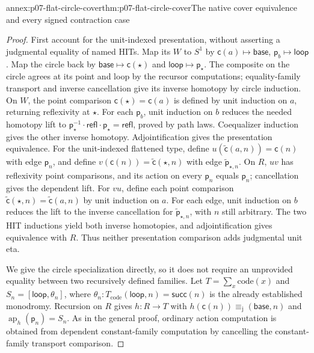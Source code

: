 \begin{annexitem}{annex:p07-flat-circle-cover}{thm:p07-flat-circle-cover}{The native cover equivalence and every signed contraction case}
\begin{proof}
First account for the unit-indexed presentation, without asserting a
judgmental equality of named HITs. Map its \(W\) to \(S^1\) by
\(\mathsf c(a)\mapsto\mathsf{base}\),
\(\mathsf p_b\mapsto\mathsf{loop}\).
Map the circle back by \(\mathsf{base}\mapsto\mathsf c(\star)\)
and \(\mathsf{loop}\mapsto\mathsf p_\star\).
The composite on the circle agrees at its point and loop by the
recursor computations; equality-family transport and inverse
cancellation give its inverse homotopy by circle induction.
On \(W\), the point comparison
\(\mathsf c(\star)=\mathsf c(a)\) is defined by unit induction on
\(a\), returning reflexivity at \(\star\).
For each \(\mathsf p_b\), unit induction on \(b\) reduces the
needed homotopy lift to
\(\mathsf p_\star^{-1}\cdot\mathsf{refl}\cdot
\mathsf p_\star=\mathsf{refl}\), proved by path laws.
Coequalizer induction gives the other inverse homotopy.
Adjointification gives the presentation equivalence.
For the unit-indexed flattened type, define
\(u(\widetilde{\mathsf c}(a,n))=\mathsf c(n)\) with edge
\(\mathsf p_n\), and define
\(v(\mathsf c(n))=\widetilde{\mathsf c}(\star,n)\) with edge
\(\widetilde{\mathsf p}_{\star,n}\).
On \(R\), \(uv\) has reflexivity point comparisons, and its action
on every \(\mathsf p_n\) equals \(\mathsf p_n\); cancellation
gives the dependent lift.
For \(vu\), define each point comparison
\(\widetilde{\mathsf c}(\star,n)=\widetilde{\mathsf c}(a,n)\)
by unit induction on \(a\). For each edge, unit induction on
\(b\) reduces the lift to the inverse cancellation for
\(\widetilde{\mathsf p}_{\star,n}\), with \(n\) still arbitrary.
The two HIT inductions yield both inverse homotopies, and
adjointification gives equivalence with \(R\).
Thus neither presentation comparison adds judgmental unit eta.

We give the circle specialization directly, so it does not require an
unprovided equality between two recursively defined families.
Let \(T=\sum_x\mathrm{code}(x)\) and
\(S_n=[\mathsf{loop},\theta_n]\), where
\(\theta_n:T_{\mathrm{code}}(\mathsf{loop},n)
 =\mathsf{succ}(n)\) is the already established monodromy.
Recursion on \(R\) gives \(h:R\to T\) with
\(h(\mathsf c(n))\equiv_{\mathrm j}(\mathsf{base},n)\)
and \(\operatorname{ap}_h(\mathsf p_n)=S_n\).
As in the general proof, ordinary action computation is obtained
from dependent constant-family computation by cancelling the
constant-family transport comparison.


\end{proof}
\end{annexitem}
